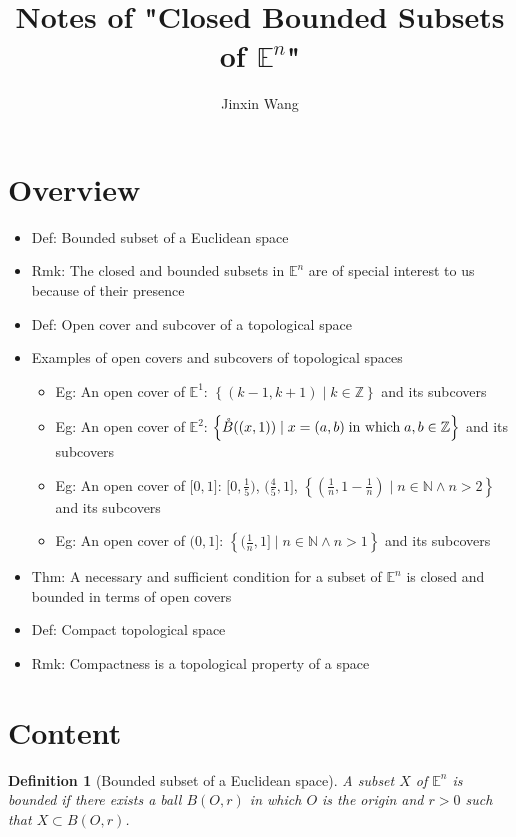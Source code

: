 \documentclass[onecolumn]{ctexart}
\title{Notes of "Closed Bounded Subsets of $\mathbb{E}^n$"}
\author{Jinxin Wang}
\date{}
\newcommand*\textinmath[1]{\thickspace\textnormal{#1}\thickspace}
\newcommand*\interior[1]{\mathring{#1}}
\newtheorem{definition}{Definition}
\begin{document}
\maketitle

\section{Overview}
\begin{itemize}
  \item Def: Bounded subset of a Euclidean space
  \item Rmk: The closed and bounded subsets in $\mathbb{E}^n$ are of special interest to us because of their presence
  \item Def: Open cover and subcover of a topological space
  \item Examples of open covers and subcovers of topological spaces
  \begin{itemize}
    \item Eg: An open cover of $\mathbb{E}^1$: $\left\{ (k - 1, k + 1) \mid k \in \mathbb{Z} \right\}$ and its subcovers
    \item Eg: An open cover of $\mathbb{E}^2$: $\left\{ \interior{B}((x, 1)) \mid x = (a, b) \textinmath{in which} a, b \in \mathbb{Z} \right\}$ and its subcovers
    \item Eg: An open cover of $\lbrack 0, 1 \rbrack$: $\lbrack 0, \frac{1}{5} \rparen$, $\lparen \frac{4}{5}, 1 \rbrack$, $\left\{ (\frac{1}{n}, 1 - \frac{1}{n}) \mid n \in \mathbb{N} \wedge n > 2 \right\}$ and its subcovers
    \item Eg: An open cover of $\lparen 0, 1 \rbrack$: $\left\{ \lparen \frac{1}{n}, 1 \rbrack \mid n \in \mathbb{N} \wedge n > 1 \right\}$ and its subcovers
  \end{itemize}
  \item Thm: A necessary and sufficient condition for a subset of $\mathbb{E}^n$ is closed and bounded in terms of open covers
  \item Def: Compact topological space
  \item Rmk: Compactness is a topological property of a space
\end{itemize}

\section{Content}
\begin{definition}[Bounded subset of a Euclidean space]
  A subset $X$ of $\mathbb{E}^n$ is bounded if there exists a ball $B(O, r)$ in 
  which $O$ is the origin and $r > 0$ such that $X \subset B(O, r)$.
\end{definition}
\end{document}
